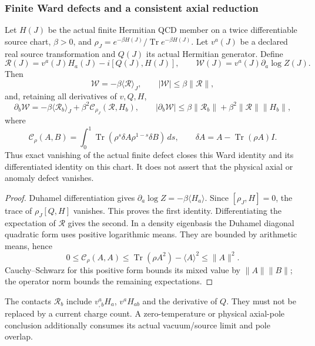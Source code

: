 \documentclass[12pt,a4paper]{article}
\begin{document}
\subsubsection{Finite Ward defects and a consistent axial reduction}
\begin{theorem}
\label{p10:thm:v2210-lit-ward-defect}
Let $H(J)$ be the actual finite Hermitian QCD member on a twice differentiable
source chart, $\beta>0$, and
$\rho_J=e^{-\beta H(J)}/\operatorname{Tr}e^{-\beta H(J)}$.
Let $v^a(J)$ be a declared real source transformation and $Q(J)$ its actual
Hermitian generator. Define
\[
 \mathcal R(J)=v^a(J)H_a(J)-i[Q(J),H(J)],\qquad
 \mathcal W(J)=v^a(J)\partial_a\log Z(J).
\]
Then
\[
 \boxed{\mathcal W=-\beta\langle\mathcal R\rangle_J,\qquad
 |\mathcal W|\le\beta\|\mathcal R\|,}
\]
and, retaining all derivatives of $v,Q,H$,
\[
 \boxed{\partial_b\mathcal W
 =-\beta\langle\mathcal R_b\rangle_J
   +\beta^2\mathcal C_{\rho_J}(\mathcal R,H_b),\qquad
 |\partial_b\mathcal W|
 \le\beta\|\mathcal R_b\|+\beta^2\|\mathcal R\|\|H_b\|,}
\]
where
\[
 \mathcal C_\rho(A,B)=\int_0^1
  \operatorname{Tr}(\rho^s\delta A\rho^{1-s}\delta B)\,ds,
 \qquad\delta A=A-\operatorname{Tr}(\rho A)I.
\]
Thus exact vanishing of the actual finite defect closes this Ward identity
and its differentiated identity on this chart. It does not assert that the
physical axial or anomaly defect vanishes.
\end{theorem}
\begin{proof}
Duhamel differentiation gives $\partial_a\log Z=-\beta\langle H_a\rangle$.
Since $[\rho_J,H]=0$, the trace of $\rho_J[Q,H]$ vanishes. This proves the
first identity. Differentiating the expectation of $\mathcal R$ gives the
second. In a density eigenbasis the Duhamel diagonal quadratic form uses
positive logarithmic means. They are bounded by arithmetic means, hence
\[
 0\le\mathcal C_\rho(A,A)
 \le\operatorname{Tr}(\rho A^2)-\langle A\rangle^2\le\|A\|^2.
\]
Cauchy--Schwarz for this positive form bounds its mixed value by
$\|A\|\|B\|$; the operator norm bounds the remaining expectations.
\end{proof}
The contacts $\mathcal R_b$ include $v^a_{,b}H_a$, $v^aH_{ab}$ and the
derivative of $Q$. They must not be replaced by a current charge count.
A zero-temperature or physical axial-pole conclusion additionally consumes
its actual vacuum/source limit and pole overlap.
\end{document}
